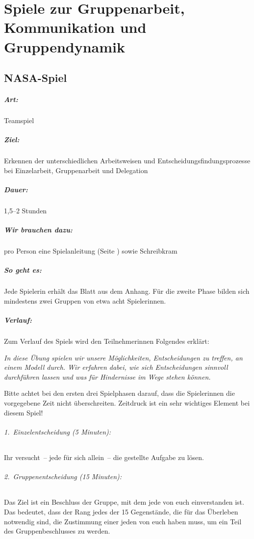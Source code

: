 \chapter{Spiele zur Gruppenarbeit, Kommunikation und Gruppendynamik}

\section{NASA-Spiel}
\label{nasa}
\paragraph{Art:} Teamspiel
\paragraph{Ziel:} Erkennen der unterschiedlichen Arbeitsweisen und Entscheidungsfindungsprozesse bei Einzelarbeit, Gruppenarbeit und Delegation
\paragraph{Dauer:} 1,5--2 Stunden
\paragraph{Wir brauchen dazu:} pro Person eine Spielanleitung (Seite \pageref{nasa-kopien}) sowie Schreibkram
\paragraph{So geht es:} Jede Spielerin erhält das Blatt aus dem Anhang. Für die zweite Phase bilden sich mindestens zwei Gruppen von etwa acht Spielerinnen.
\paragraph{Verlauf:} Zum Verlauf des Spiels wird den Teilnehmerinnen Folgendes erklärt:

\emph{In diese Übung spielen wir unsere Möglichkeiten, Entscheidungen zu treffen, an einem Modell durch. Wir erfahren dabei, wie sich Entscheidungen sinnvoll durchführen lassen und was für Hindernisse im Wege stehen können.}

Bitte achtet bei den ersten drei Spielphasen darauf, dass die Spielerinnen die vorgegebene Zeit nicht überschreiten. Zeitdruck ist ein sehr wichtiges Element bei diesem Spiel!
\subparagraph{1.~Einzelentscheidung (5 Minuten):} Ihr versucht~-- jede für sich allein~-- die gestellte Aufgabe zu lösen.
\subparagraph{2.~Gruppenentscheidung (15 Minuten):} Das Ziel ist ein Beschluss der Gruppe, mit dem jede von euch einverstanden ist. Das bedeutet, dass der Rang jedes der 15 Gegenstände, die für das Überleben notwendig sind, die Zustimmung einer jeden von euch haben muss, um ein Teil des Gruppenbeschlusses zu werden.

